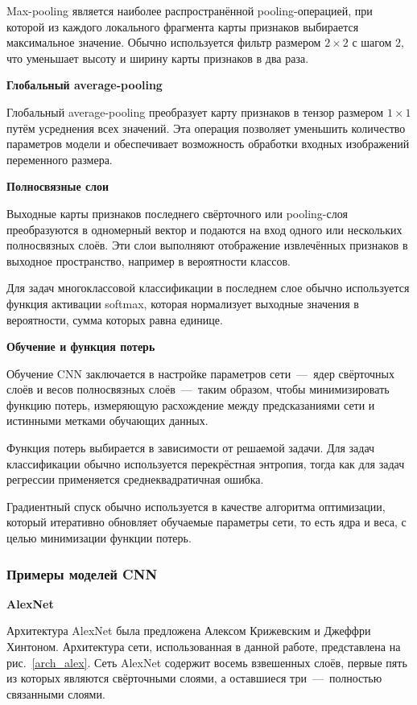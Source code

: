 Max-pooling является наиболее распространённой pooling-операцией, при которой из каждого локального фрагмента карты признаков выбирается максимальное значение. Обычно используется фильтр размером $2 \times 2$ с шагом 2, что уменьшает высоту и ширину карты признаков в два раза.

\textbf{Глобальный average-pooling}


Глобальный average-pooling преобразует карту признаков в тензор размером $1 \times 1$ путём усреднения всех значений. Эта операция позволяет уменьшить количество параметров модели и обеспечивает возможность обработки входных изображений переменного размера.

\textbf{Полносвязные слои}


Выходные карты признаков последнего свёрточного или pooling-слоя преобразуются в одномерный вектор и подаются на вход одного или нескольких полносвязных слоёв. Эти слои выполняют отображение извлечённых признаков в выходное пространство, например в вероятности классов.

Для задач многоклассовой классификации в последнем слое обычно используется функция активации softmax, которая нормализует выходные значения в вероятности, сумма которых равна единице.

\textbf{Обучение и функция потерь}


Обучение CNN заключается в настройке параметров сети~---~ядер свёрточных слоёв и весов полносвязных слоёв~---~таким образом, чтобы минимизировать функцию потерь, измеряющую расхождение между предсказаниями сети и истинными метками обучающих данных.

Функция потерь выбирается в зависимости от решаемой задачи. Для задач классификации обычно используется перекрёстная энтропия, тогда как для задач регрессии применяется среднеквадратичная ошибка.

Градиентный спуск обычно используется в качестве алгоритма оптимизации, который итеративно обновляет обучаемые параметры сети, то есть ядра и веса, с целью минимизации функции потерь.

\subsubsection{Примеры моделей CNN}

\textbf{AlexNet}

Архитектура AlexNet была предложена Алексом Крижевским и Джеффри Хинтоном. Архитектура сети, использованная в данной работе, представлена на рис.~\ref{arch_alex}. Сеть AlexNet содержит восемь взвешенных слоёв, первые пять из которых являются свёрточными слоями, а оставшиеся три~---~полностью связанными слоями.

